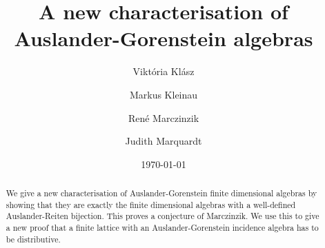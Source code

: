 \documentclass[a4paper]{amsart}
\theoremstyle{definition}
\theoremstyle{remark}
\numberwithin{equation}{section}
\begin{document}
\title{A new characterisation of Auslander-Gorenstein algebras}
\date{\today}
\author[V.~Kl\'asz]{Vikt\'oria Kl\'asz}%
\address[V.~Kl\'asz]{Mathematical Institute of the University of Bonn, Endenicher Allee 60, 53115 Bonn, Germany}%
%

\author[M.~Kleinau]{Markus Kleinau}%
\address[M.~Kleinau]{Mathematical Institute of the University of Bonn, Endenicher Allee 60, 53115 Bonn, Germany}%
%

\author[R.~Marczinzik]{Ren\'e Marczinzik}%
\address[R.~Marczinzik]{Mathematical Institute of the University of Bonn, Endenicher Allee 60, 53115 Bonn, Germany}

\author[J.~Marquardt]{Judith Marquardt}%
\address[J.~Marquardt]{Univ. Grenoble Alpes, CNRS, IF, 38000 Grenoble, France, and Universit\'e Paris-Saclay, UVSQ, CNRS, Laboratoire de Math\'ematiques de Versailles, 78000, Versailles, France}






\begin{abstract}
We give a new characterisation of Auslander-Gorenstein finite dimensional algebras by showing that they are exactly the finite dimensional algebras with a well-defined Auslander-Reiten bijection. This proves a conjecture of Marczinzik. We use this to give a new proof that a finite lattice with an Auslander-Gorenstein incidence algebra has to be distributive.
\end{abstract}

\maketitle
\end{document}
